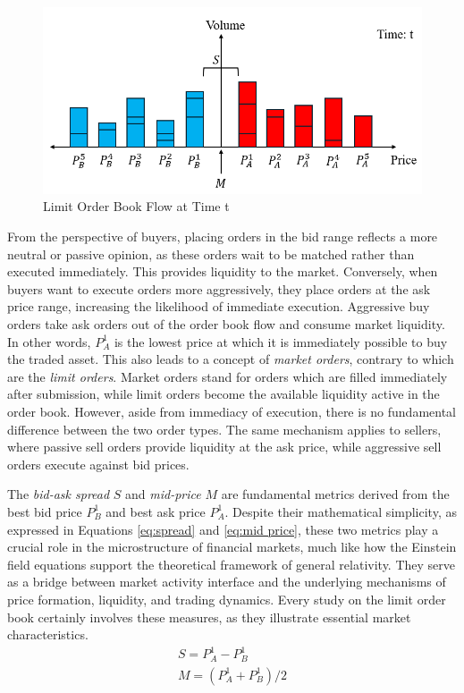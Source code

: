 \begin{figure}[h]
    \centering
    \includegraphics[width=0.8\linewidth]{figures/order_book_t.png}
    \caption{Limit Order Book Flow at Time t}
    \label{fig: order_book_t}
\end{figure}

From the perspective of buyers, placing orders in the bid range reflects a more neutral or passive opinion, as these orders wait to be matched rather than executed immediately. This provides liquidity to the market. Conversely, when buyers want to execute orders more aggressively, they place orders at the ask price range, increasing the likelihood of immediate execution. Aggressive buy orders take ask orders out of the order book flow and consume market liquidity. In other words, $P_A ^ {1}$ is the lowest price at which it is immediately possible to buy the traded asset. This also leads to a concept of \textit{market orders}, contrary to which are the \textit{limit orders}. Market orders stand for orders which are filled immediately after submission, while limit orders become the available liquidity active in the order book. However, aside from immediacy of execution, there is no fundamental difference between the two order types. The same mechanism applies to sellers, where passive sell orders provide liquidity at the ask price, while aggressive sell orders execute against bid prices.

The \textit{bid-ask spread} $S$ and \textit{mid-price} $M$ are fundamental metrics derived from the best bid price $P_B ^ {1}$ and best ask price $P_A ^ {1}$. Despite their mathematical simplicity, as expressed in Equations \ref{eq:spread} and \ref{eq:mid price}, these two metrics play a crucial role in the \gls{microstructure of financial markets}, much like how the Einstein field equations support the theoretical framework of general relativity. They serve as a bridge between market activity interface and the underlying mechanisms of price formation, liquidity, and trading dynamics. Every study on the limit order book certainly involves these measures, as they illustrate essential market characteristics.
\begin{align}
    S = P_A ^ {1} - P_B ^ {1}  \label{eq:spread}\\
    M = (P_A ^ {1} + P_B ^ {1})/2
    \label{eq:mid price}
\end{align}

